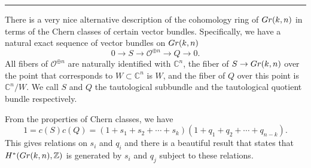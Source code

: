\documentclass[11pt]{article}
\numberwithin{equation}{section}
\numberwithin{footnote}{section}
\newcommand{\blue}{\color{blue}}
\newcommand{\Gr}{{\rm Gr}}
\newcommand{\Z}{{\mathbb Z}}
\newcommand{\C}{{\mathbb C}}
\begin{document}
\smallskip
{\blue \hrule}
There is a very nice alternative description of the cohomology ring of $\Gr(k,n)$ in terms of the Chern classes of certain vector bundles. Specifically, we have a natural exact sequence of vector bundles on $\Gr(k,n)$
\begin{equation}\label{naturalGr}
0\to S\to \mathcal O^{\oplus n} \to Q\to 0.
\end{equation}
All fibers of $\mathcal O^{\oplus n}$ are naturally identified with $\C^n$, 
the fiber of $S\to \Gr(k,n)$ over the point that corresponds to $W\subset \C^n$ is $W$, and the fiber of $Q$ over this point is 
$\C^n/W$. We call $S$ and $Q$ the tautological subbundle and the tautological quotient bundle respectively.

\smallskip
From the properties of Chern classes, we have
$$
1=c(S) c(Q) = (1+s_1 + s_2 + \cdots + s_k)(1+q_1 + q_2 + \cdots + q_{n-k}).
$$
This gives relations on $s_i$ and $q_i$ and there is a beautiful result that states that $H^*(\Gr(k,n),\Z)$ is generated by $s_i$ and $q_j$ subject to these relations. 
\end{document}
